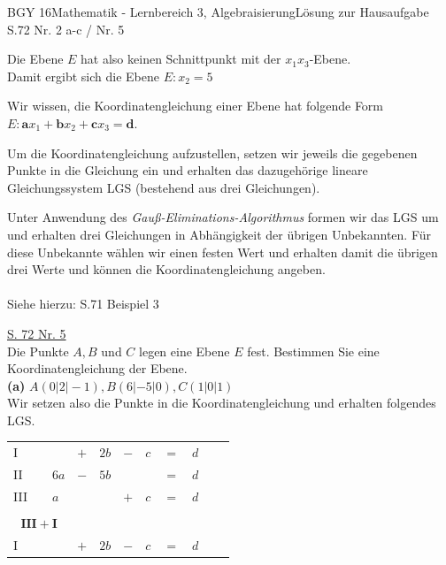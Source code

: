 \documentclass[oneside,openany,headings=optiontotoc,11pt,numbers=noenddot]{scrreprt}
\begin{document}
\begin{worksheet}{BGY 16}{Mathematik - Lernbereich 3, Algebraisierung}{Lösung zur Hausaufgabe S.72 Nr. 2 a-c / Nr. 5}
\begin{framed}
			Die Ebene \(E\) hat also keinen Schnittpunkt mit der \(x_1x_3\)-Ebene.\\
			Damit ergibt sich die Ebene \colorbox{green!10}{\(E: x_2 = 5\)}
		\end{framed}
		\begin{framed}
			\noindent
			Wir wissen, die Koordinatengleichung einer Ebene hat folgende Form \colorbox{green!10}{\(E: \mathbf{a}x_1 + \mathbf{b}x_2 + \mathbf{c}x_3 = \mathbf{d}\)}.\\
			\par\noindent
			Um die Koordinatengleichung aufzustellen, setzen wir jeweils die gegebenen Punkte in die Gleichung ein und erhalten das dazugehörige lineare Gleichungssystem LGS (bestehend aus drei Gleichungen).\\
			\par\noindent
			Unter Anwendung des \textit{Gauß-Eliminations-Algorithmus} formen wir das LGS um und erhalten drei Gleichungen in Abhängigkeit der übrigen Unbekannten. Für diese Unbekannte wählen wir einen festen Wert und erhalten damit die übrigen drei Werte und können die Koordinatengleichung angeben.\\
			\hdashrule[0.5ex][x]{\textwidth}{0.1mm}{8mm 2pt}\\
			Siehe hierzu: S.71 Beispiel 3\\
		\end{framed}
		\begin{framed}
			\noindent
			\tiny{\color{codegray}\underline{S. 72 Nr. 5}}\\
			\normalsize\noindent
			Die Punkte \(A, B\) und \(C\) legen eine Ebene \(E\) fest. Bestimmen Sie eine Koordinatengleichung der Ebene.\\
			\textbf{(a)} \(A(0|2|-1), B(6|-5|0), C(1|0|1)\)\\
			Wir setzen also die Punkte in die Koordinatengleichung und erhalten folgendes LGS.
			\begin{tabularx}{\textwidth}{lllllllllll}
				I & \(\) & \(\) & \(+\) & \(2b\) & \(-\) & \(c\) & \(=\) & \(d\)\\
				II & \(\) & \(6a\) & \(-\) & \(5b\) & \(\) & \(\) & \(=\) & \(d\)\\
				III & \(\) & \(a\) & \(\) & \(\) & \(+\) & \(c\) & \(=\) & \(d\)\\
				\cline{1-9}\\
				\multicolumn{3}{c}{\(\mathbf{III + I}\)}\\
				I & \(\) & \(\) & \(+\) & \(2b\) & \(-\) & \(c\) & \(=\) & \(d\)\\

\end{tabularx}
\end{framed}
\end{worksheet}
\end{document}
